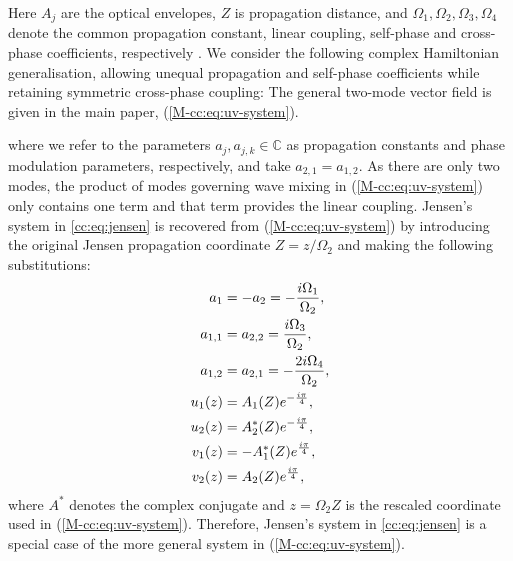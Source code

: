 \documentclass[11pt,a4paper]{article}
\newcommand{\externaleqref}[1]{\textup{(\ref*{#1})}}
\begin{document}
Here $A_j$ are the optical envelopes, $Z$ is propagation distance, and $\Omega_1,\Omega_2,\Omega_3,\Omega_4$ denote the common propagation constant, linear coupling, self-phase and cross-phase coefficients, respectively \cite{jensenNonlinearCoherentCoupler1982}.
We consider the following complex Hamiltonian generalisation, allowing unequal propagation and self-phase coefficients while retaining symmetric cross-phase coupling:
The general two-mode vector field is given in the main paper, \externaleqref{M-cc:eq:uv-system}.

where we refer to the parameters $a_j, a_{j,k} \in \mathbb{C}$ as propagation constants and phase modulation parameters, respectively, and take $a_{2,1} = a_{1,2}$.
As there are only two modes, the product of modes governing wave mixing in \externaleqref{M-cc:eq:uv-system} only contains one term and that term provides the linear coupling.
Jensen's system in \eqref{cc:eq:jensen} is recovered from \externaleqref{M-cc:eq:uv-system} by introducing the original Jensen propagation coordinate $Z=z/\Omega_2$ and making the following substitutions:
\begin{align}
a_1 &= - a_2 = - \frac{i {\Omega}_{1}}{{\Omega}_{2}}, \notag \\
a_{1,1} &= a_{2,2} = \frac{i {\Omega}_{3}}{{\Omega}_{2}}, \notag \\
a_{1,2} &= a_{2,1} = - \frac{2 i {\Omega}_{4}}{{\Omega}_{2}}, \notag \\
u_1(z) &= A_1{\left(Z\right)} e^{- \frac{i \pi}{4}}, \notag \\
u_2(z) &= A^{*}_2{\left(Z\right)} e^{- \frac{i \pi}{4}}, \notag \\
v_1(z) &= -A^{*}_1{\left(Z\right)} e^{\frac{i \pi}{4}}, \notag \\
v_2(z) &= A_2{\left(Z\right)} e^{\frac{i \pi}{4}}, \label{cc:eq:uv-to-jensen}
\end{align}
where $A^*$ denotes the complex conjugate and $z=\Omega_2 Z$ is the rescaled coordinate used in \externaleqref{M-cc:eq:uv-system}.
Therefore, Jensen's system in \eqref{cc:eq:jensen} is a special case of the more general system in \externaleqref{M-cc:eq:uv-system}.
\end{document}
